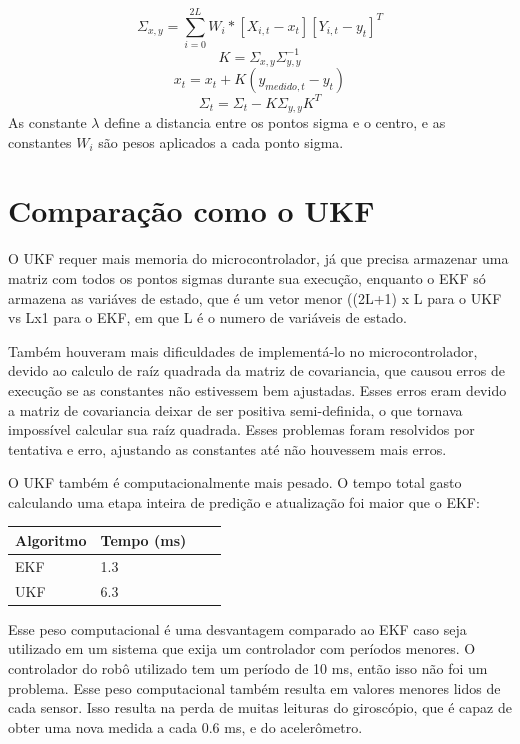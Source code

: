 \documentclass[
	12pt,				%
	openright,			%
	twoside,			%
	convert,
	a4paper,			%
	english,			%
	french,				%
	spanish,			%
	brazil				%
	]{abntex2}
\begin{document}
\begin{equation}
	\Sigma_{x,y} = \sum\limits_{i=0}^{2L} W_i * [X_{i, t} - x_t] [Y_{i, t} - y_t]^T
\end{equation}
\begin{equation}
	K = \Sigma_{x,y} \Sigma_{y,y}^{-1}
\end{equation}
\begin{equation}
	x_t = x_t + K (y_{medido, t} - y_t)
\end{equation}
\begin{equation}
	\Sigma_t = \Sigma_t - K  \Sigma_{y,y} K^{T}
\end{equation}
As constante $\lambda$ define a distancia entre os pontos sigma e o centro, e as constantes $W_i$ são pesos aplicados a cada ponto sigma.

\section{Comparação como o UKF}
O UKF requer mais memoria do microcontrolador, já que precisa armazenar uma matriz com todos os pontos sigmas durante sua execução, enquanto o EKF só armazena as variáves de estado, que é um vetor menor ((2L+1) x L para o UKF vs Lx1 para o EKF, em que L é o numero de variáveis de estado. 
\par
Também houveram mais dificuldades de implementá-lo no microcontrolador, devido ao calculo de raíz quadrada da matriz de covariancia, que causou erros de execução se as constantes não estivessem bem ajustadas. Esses erros eram devido a matriz de covariancia deixar de ser positiva semi-definida, o que tornava impossível calcular sua raíz quadrada. Esses problemas foram resolvidos por tentativa e erro, ajustando as constantes até não houvessem mais erros.
\par
O UKF também é computacionalmente mais pesado. O tempo total gasto calculando uma etapa inteira de predição e atualização foi maior que o EKF:
\begin{center}
\begin{tabular}{ | l | l | l | p{5cm} |}
    \hline
    Algoritmo & Tempo (ms) \\ \hline
    EKF & 1.3 \\ \hline
    UKF & 6.3 \\
    \hline
\end{tabular}
\end{center}
Esse peso computacional é uma desvantagem comparado ao EKF caso seja utilizado em um sistema que exija um controlador com períodos menores. O controlador do robô utilizado tem um período de 10 ms, então isso não foi um problema. Esse peso computacional também resulta em valores menores lidos de cada sensor. Isso resulta na perda de muitas leituras do giroscópio, que é capaz de obter uma nova medida a cada 0.6 ms, e do acelerômetro.
\end{document}
